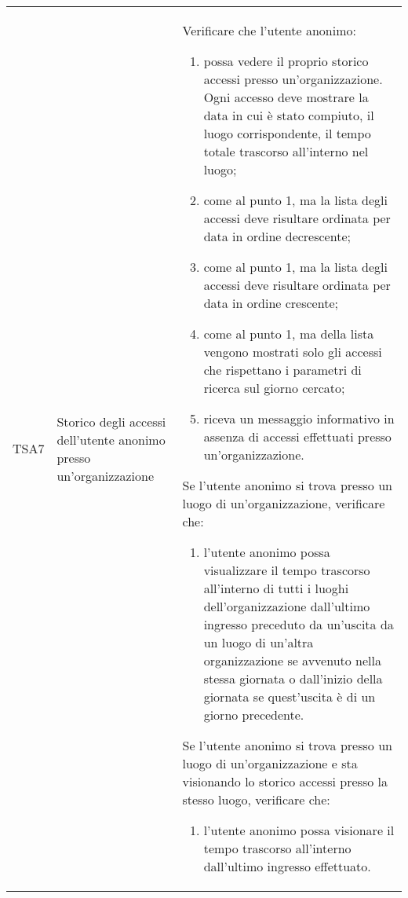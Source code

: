{\begin{longtable}{ c | C{3cm} | C{11cm} }
TSA7 & Storico degli accessi dell'utente anonimo presso un'organizzazione & 
Verificare che l'utente anonimo:
\begin{enumerate}
    \item possa vedere il proprio storico accessi presso un'organizzazione. Ogni accesso deve mostrare la data in cui è stato compiuto, il luogo corrispondente, il tempo totale trascorso all'interno nel luogo;
    \item come al punto 1, ma la lista degli accessi deve risultare ordinata per data in ordine decrescente;
    \item come al punto 1, ma la lista degli accessi deve risultare ordinata per data in ordine crescente;
    \item come al punto 1, ma della lista vengono mostrati solo gli accessi che rispettano i parametri di ricerca sul giorno cercato;
    \item riceva un messaggio informativo in assenza di accessi effettuati presso un'organizzazione.
\end{enumerate}
Se l'utente anonimo si trova presso un luogo di un'organizzazione, verificare che:
\begin{enumerate}
    \item l'utente anonimo possa visualizzare il tempo trascorso all'interno di tutti i luoghi dell'organizzazione dall'ultimo ingresso preceduto da un'uscita da un luogo di un'altra organizzazione se avvenuto nella stessa giornata o dall'inizio della giornata se quest'uscita è di un giorno precedente. %
\end{enumerate}
Se l'utente anonimo si trova presso un luogo di un'organizzazione e sta visionando lo storico accessi presso la stesso luogo, verificare che:
\begin{enumerate}
    \item l'utente anonimo possa visionare il tempo trascorso all'interno dall'ultimo ingresso effettuato.
\end{enumerate} \\


\end{longtable}}

